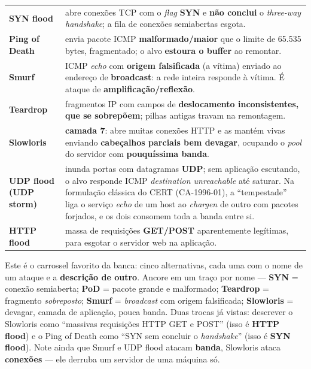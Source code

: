 \begin{center}
\begin{tabular}{@{}p{2.6cm}p{9.4cm}@{}}
\toprule
\textbf{SYN flood} & abre conexões TCP com o \emph{flag} \textbf{SYN} e
\textbf{não conclui} o \emph{three-way handshake}; a fila de conexões
semiabertas esgota. \\
\addlinespace
\textbf{Ping of Death} & envia pacote ICMP \textbf{malformado/maior} que o
limite de 65.535 bytes, fragmentado; o alvo \textbf{estoura o buffer} ao
remontar. \\
\addlinespace
\textbf{Smurf} & ICMP \emph{echo} com \textbf{origem falsificada} (a vítima)
enviado ao endereço de \textbf{broadcast}: a rede inteira responde à vítima.
É ataque de \textbf{amplificação/reflexão}. \\
\addlinespace
\textbf{Teardrop} & fragmentos IP com campos de \textbf{deslocamento
inconsistentes, que se sobrepõem}; pilhas antigas travam na remontagem. \\
\addlinespace
\textbf{Slowloris} & \textbf{camada 7}: abre muitas conexões HTTP e as mantém
vivas enviando \textbf{cabeçalhos parciais bem devagar}, ocupando o
\emph{pool} do servidor com \textbf{pouquíssima banda}. \\
\addlinespace
\textbf{UDP flood \newline (UDP storm)} & inunda portas com datagramas
\textbf{UDP}; sem aplicação escutando, o alvo responde ICMP
\emph{destination unreachable} até saturar. Na formulação clássica do CERT
(CA-1996-01), a ``tempestade'' liga o serviço \emph{echo} de um host ao
\emph{chargen} de outro com pacotes forjados, e os dois consomem toda a banda
entre si. \\
\addlinespace
\textbf{HTTP flood} & massa de requisições \textbf{GET/POST} aparentemente
legítimas, para esgotar o servidor web na aplicação. \\
\bottomrule
\end{tabular}
\end{center}

\begin{pegadinha}
Este é o carrossel favorito da banca: cinco alternativas, cada uma com o nome
de um ataque e a \textbf{descrição de outro}. Ancore em um traço por nome ---
\textbf{SYN} = conexão semiaberta; \textbf{PoD} = pacote grande e malformado;
\textbf{Teardrop} = fragmento \emph{sobreposto}; \textbf{Smurf} =
\emph{broadcast} com origem falsificada; \textbf{Slowloris} = devagar, camada
de aplicação, pouca banda. Duas trocas já vistas: descrever o Slowloris como
``massivas requisições HTTP GET e POST'' (isso é \textbf{HTTP flood}) e o
Ping of Death como ``SYN sem concluir o \emph{handshake}'' (isso é
\textbf{SYN flood}). Note ainda que Smurf e UDP flood atacam \textbf{banda},
Slowloris ataca \textbf{conexões} --- ele derruba um servidor de uma máquina
só.
\end{pegadinha}

